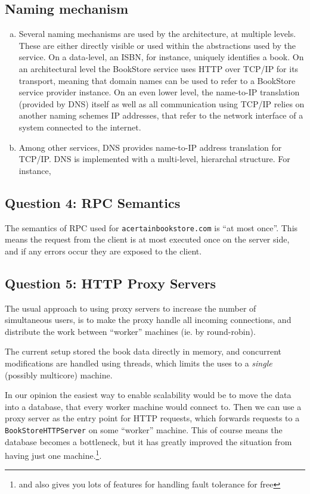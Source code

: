 \documentclass[11pt,a4paper,english]{article}
\begin{document}
\subsection{Naming mechanism}
\begin{enumerate}[(a)]
\item{Several naming mechanisms are used by the architecture, at multiple levels. These are either directly visible or used within the abstractions used by the service. On a data-level, an ISBN, for instance, uniquely identifies a book. On an architectural level the BookStore service uses HTTP over TCP/IP for its transport, meaning that domain names can be used to refer to a BookStore service provider instance. On an even lower level, the name-to-IP translation (provided by DNS) itself as well as all communication using TCP/IP relies on another naming schemes IP addresses, that refer to the network interface of a system connected to the internet.}

\item{Among other services, DNS provides name-to-IP address translation for TCP/IP. DNS is implemented with a multi-level, hierarchal structure.  For instance, }
\end{enumerate}


\subsection{Question 4: RPC Semantics}

The semantics of RPC used for \texttt{acertainbookstore.com} is ``at most
once''. This means the request from the client is at most executed once on the
server side, and if any errors occur they are exposed to the client.


\subsection{Question 5: HTTP Proxy Servers}

The usual approach to using proxy servers to increase the number of simultaneous
users, is to make the proxy handle all incoming connections, and distribute the
work between ``worker'' machines (ie. by round-robin).

The current setup stored the book data directly in memory, and concurrent
modifications are handled using threads, which limits the uses to a
\emph{single} (possibly multicore) machine.

In our opinion the easiest way to enable scalability would be to move the data
into a database, that every worker machine would connect to. Then we can use a
proxy server as the entry point for HTTP requests, which forwards requests to a
\texttt{BookStoreHTTPServer} on some ``worker'' machine. This of course means
the database becomes a bottleneck, but it has greatly improved the situation
from having just one machine.\footnote{and also gives you lots of features for
  handling fault tolerance for free}.
\end{document}
